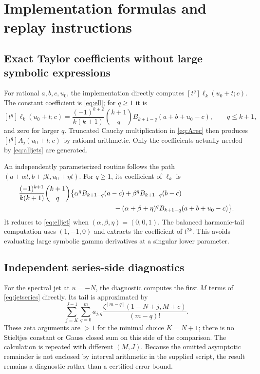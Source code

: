 \section{Implementation formulas and replay instructions}\label{sec:implementation}

\subsection{Exact Taylor coefficients without large symbolic expressions}
For rational $a,b,c,u_0$, the implementation directly computes
$[t^q]\ell_k(u_0+t;c)$.  The constant coefficient is \eqref{eq:ell}; for
$q\ge1$ it is
\begin{equation}\label{eq:elljet}
 [t^q]\ell_k(u_0+t;c)=
 \frac{(-1)^{k+2}}{k(k+1)}\binom{k+1}{q}
 B_{k+1-q}(a+b+u_0-c),\qquad q\le k+1,
\end{equation}
and zero for larger $q$.  Truncated Cauchy multiplication in
\eqref{eq:Arec} then produces $[t^q]A_j(u_0+t;c)$ by rational arithmetic.
Only the coefficients actually needed by \eqref{eq:alljets} are generated.

An independently parameterized routine follows the path
$(a+\alpha t,b+\beta t,u_0+\eta t)$.
For $q\ge1$, its coefficient of $\ell_k$ is
\begin{align}
 &\frac{(-1)^{k+1}}{k(k+1)}\binom{k+1}{q}
 \bigl\{\alpha^q B_{k+1-q}(a-c)+\beta^q B_{k+1-q}(b-c)\notag\\
 &\hspace{49mm}-(\alpha+\beta+\eta)^q
                    B_{k+1-q}(a+b+u_0-c)\bigr\}.
 \label{eq:pathjet}
\end{align}
It reduces to \eqref{eq:elljet} when $(\alpha,\beta,\eta)=(0,0,1)$.
The balanced harmonic-tail computation uses $(1,-1,0)$ and extracts the
coefficient of $t^{2k}$.  This avoids evaluating large symbolic gamma
derivatives at a singular lower parameter.

\subsection{Independent series-side diagnostics}
For the spectral jet at $u=-N$, the diagnostic computes the first $M$
terms of \eqref{eq:jetseries} directly.  Its tail is approximated by
\begin{equation}\label{eq:numerictail}
 \sum_{j=K}^{J-1}\sum_{q=0}^m
 a_{j,q}\frac{\zeta^{[m-q]}(1-N+j,M+c)}{(m-q)!}.
\end{equation}
These zeta arguments are $>1$ for the minimal choice $K=N+1$;
there is no Stieltjes constant or Gauss closed sum on this side of the
comparison.  The calculation is repeated with different $(M,J)$.
Because the omitted asymptotic remainder is not enclosed by interval
arithmetic in the supplied script, the result remains a diagnostic rather
than a certified error bound.

